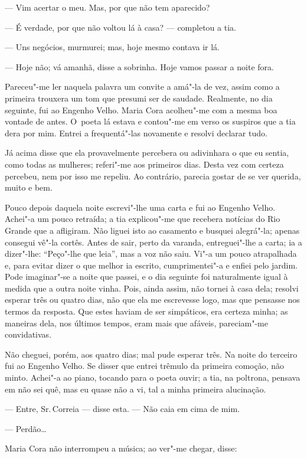 \begin{linenumbers}
--- Vim acertar o meu. Mas, por que não tem aparecido?

--- É verdade, por que não voltou lá à casa? --- completou a tia.

--- Uns negócios, murmurei; mas, hoje mesmo contava ir lá.

--- Hoje não; vá amanhã, disse a sobrinha. Hoje vamos passar a noite
fora.

Pareceu"-me ler naquela palavra um convite a amá"-la de vez, assim como a
primeira trouxera um tom que presumi ser de saudade. Realmente, no dia
seguinte, fui ao Engenho Velho. Maria Cora acolheu"-me com a mesma boa
vontade de antes. O~poeta lá estava e contou"-me em verso os suspiros que
a tia dera por mim. Entrei a frequentá"-las novamente e resolvi declarar
tudo.

Já acima disse que ela provavelmente percebera ou adivinhara o que eu
sentia, como todas as mulheres; referi"-me aos primeiros dias. Desta vez
com certeza percebeu, nem por isso me repeliu. Ao contrário, parecia
gostar de se ver querida, muito e bem.

Pouco depois daquela noite escrevi"-lhe uma carta e fui ao Engenho Velho.
Achei"-a um pouco retraída; a tia explicou"-me que recebera notícias do
Rio Grande que a afligiram. Não liguei isto ao casamento e busquei
alegrá"-la; apenas consegui vê"-la cortês. Antes de sair, perto da
varanda, entreguei"-lhe a carta; ia a dizer"-lhe: ``Peço"-lhe que leia'',
mas a voz não saiu. Vi"-a um pouco atrapalhada e, para evitar dizer o que
melhor ia escrito, cumprimentei"-a e enfiei pelo jardim. Pode imaginar"-se
a noite que passei, e o dia seguinte foi naturalmente igual à medida que
a outra noite vinha. Pois, ainda assim, não tornei à casa dela; resolvi
esperar três ou quatro dias, não que ela me escrevesse logo, mas que
pensasse nos termos da resposta. Que estes haviam de ser simpáticos, era
certeza minha; as maneiras dela, nos últimos tempos, eram mais que
afáveis, pareciam"-me convidativas.

Não cheguei, porém, aos quatro dias; mal pude esperar três. Na noite do
terceiro fui ao Engenho Velho. Se disser que entrei trêmulo da primeira
comoção, não minto. Achei"-a ao piano, tocando para o poeta ouvir; a tia,
na poltrona, pensava em não sei quê, mas eu quase não a vi, tal a minha
primeira alucinação.

--- Entre, Sr.\,Correia --- disse esta. --- Não caia em cima de mim.

--- Perdão\ldots{}

Maria Cora não interrompeu a música; ao ver"-me chegar, disse:


\end{linenumbers}

